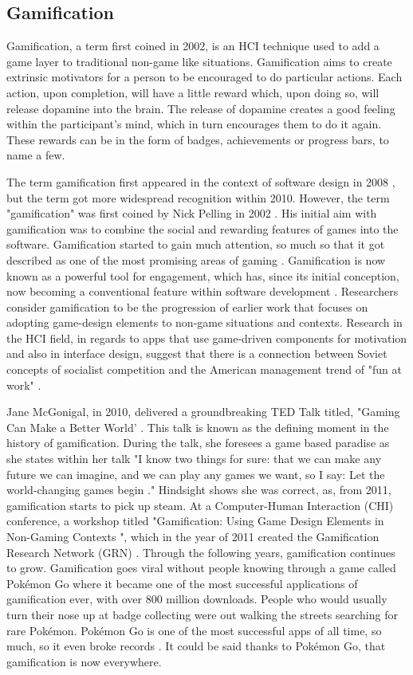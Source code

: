 	
	\subsection{Gamification}
	Gamification, a term first coined in 2002, is an HCI technique used to add a game layer to traditional non-game like situations. Gamification aims to create extrinsic motivators for a person to be encouraged to do particular actions. Each action, upon completion, will have a little reward which, upon doing so, will release dopamine into the brain. The release of dopamine creates a good feeling within the participant's mind, which in turn encourages them to do it again. These rewards can be in the form of badges, achievements or progress bars, to name a few.
	
	The term gamification first appeared in the context of software design in 2008 \cite{4}, but the term got more widespread recognition within 2010. However, the term "gamification" was first coined by Nick Pelling in 2002 \cite{3e}. His initial aim with gamification was to combine the social and rewarding features of games into the software. Gamification started to gain much attention, so much so that it got described as one of the most promising areas of gaming \cite{5}. Gamification is now known as a powerful tool for engagement, which has, since its initial conception, now becoming a conventional feature within software development \cite{3e}. Researchers consider gamification to be the progression of earlier work that focuses on adopting game-design elements to non-game situations and contexts. Research in the HCI field, in regards to apps that use game-driven components for motivation and also in interface design, suggest that there is a connection between Soviet concepts of socialist competition and the American management trend of "fun at work" \cite{5}.
	
	Jane McGonigal, in 2010, delivered a groundbreaking TED Talk titled, "Gaming Can Make a Better World' \cite{6}. This talk is known as the defining moment in the history of gamification. During the talk, she foresees a game based paradise as she states within her talk "I know two things for sure: that we can make any future we can imagine, and we can play any games we want, so I say: Let the world-changing games begin \cite{6}." Hindsight shows she was correct, as, from 2011, gamification starts to pick up steam.  At a Computer-Human Interaction (CHI) conference, a workshop titled "Gamification: Using Game Design Elements in Non-Gaming Contexts \cite{7}", which in the year of 2011 created the Gamification Research Network (GRN) \cite{11}. Through the following years, gamification continues to grow. Gamification goes viral without people knowing through a game called Pokémon Go where it became one of the most successful applications of gamification ever, with over 800 million downloads. People who would usually turn their nose up at badge collecting were out walking the streets searching for rare Pokémon. Pokémon Go is one of the most successful apps of all time, so much, so it even broke records \cite{3e,8}. It could be said thanks to Pokémon Go, that gamification is now everywhere.  
	
